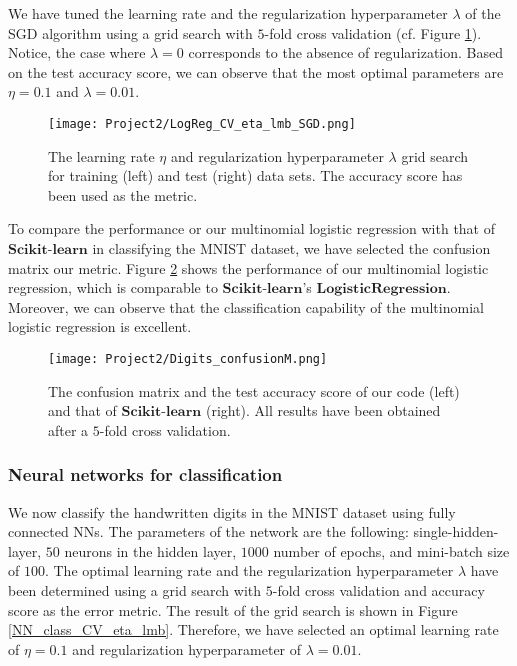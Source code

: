 \documentclass[a4paper]{article}
\begin{document}
We have tuned the learning rate and the regularization hyperparameter $\lambda$ of the SGD algorithm using a grid search with $5$-fold cross validation  (cf. Figure \ref{LogReg_CV_eta_lmb_SGD}). Notice, the case where $\lambda=0$ corresponds to the absence of regularization. Based on the test accuracy score, we can observe that the most optimal parameters are $\eta=0.1$ and $\lambda=0.01$.

\begin{figure}[H]
  \centering
  \texttt{[image: Project2/LogReg\_CV\_eta\_lmb\_SGD.png]}
  \caption{The learning rate $\eta$ and regularization hyperparameter $\lambda$ grid search for training (left) and test (right) data sets. The accuracy score has been used as the metric.}
    \label{LogReg_CV_eta_lmb_SGD}
\end{figure}

To compare the performance or our multinomial logistic regression with that of $\mathbf{Scikit}$-$\mathbf{learn}$ in classifying the MNIST dataset, we have selected the confusion matrix our metric. Figure \ref{Digits_confusionM} shows the performance of our multinomial logistic regression, which is comparable to $\mathbf{Scikit}$-$\mathbf{learn}$'s $\mathbf{LogisticRegression}$. Moreover, we can observe that the classification capability of the multinomial logistic regression is excellent.

\begin{figure}[H]
  \centering
  \texttt{[image: Project2/Digits\_confusionM.png]}
  \caption{The confusion matrix and the test accuracy score of our code (left) and that of $\mathbf{Scikit}$-$\mathbf{learn}$ (right). All results have been obtained after a $5$-fold cross validation.}
    \label{Digits_confusionM}
\end{figure}

\subsubsection{Neural networks for classification}
We now classify the handwritten digits in the MNIST dataset using fully connected NNs. The parameters of the network are the following: single-hidden-layer, $50$ neurons in the hidden layer, $1000$ number of epochs, and mini-batch size of $100$. The optimal learning rate and the regularization hyperparameter $\lambda$ have been determined using a grid search with $5$-fold cross validation and accuracy score as the error metric. The result of the grid search is shown in Figure \ref{NN_class_CV_eta_lmb}. Therefore, we have selected an optimal learning rate of $\eta=0.1$ and regularization hyperparameter of $\lambda=0.01$.
\end{document}
